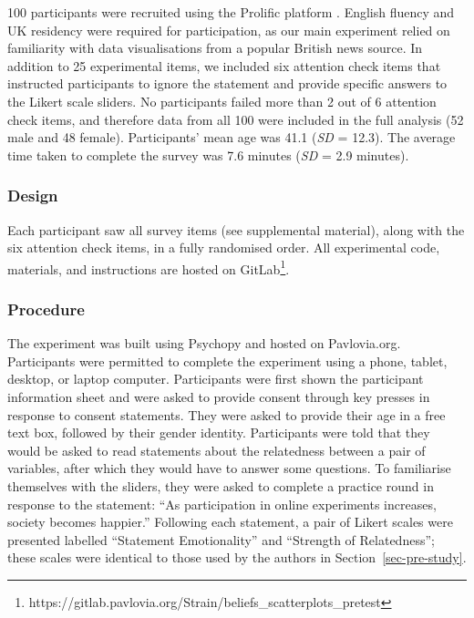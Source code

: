 \documentclass[sigconf]{acmart}
\begin{document}
100 participants were recruited using the Prolific platform
\citep{prolific}. English fluency and UK residency were required for
participation, as our main experiment relied on familiarity with data
visualisations from a popular British news source. In addition to 25
experimental items, we included six attention check items that
instructed participants to ignore the statement and provide specific
answers to the Likert scale sliders. No participants failed more than 2
out of 6 attention check items, and therefore data from all 100 were
included in the full analysis (52 male and 48 female). Participants'
mean age was 41.1 (\emph{SD} = 12.3). The average time taken to complete
the survey was 7.6 minutes (\emph{SD} = 2.9 minutes).

\subsubsection{Design}\label{sec-design-pre}

Each participant saw all survey items (see supplemental material), along
with the six attention check items, in a fully randomised order. All
experimental code, materials, and instructions are hosted on
GitLab\footnote{https://gitlab.pavlovia.org/Strain/beliefs\_scatterplots\_pretest}.

\subsubsection{Procedure}\label{sec-procedure-pre}

The experiment was built using Psychopy \citep{pierce_2019} and hosted
on Pavlovia.org. Participants were permitted to complete the experiment
using a phone, tablet, desktop, or laptop computer. Participants were
first shown the participant information sheet and were asked to provide
consent through key presses in response to consent statements. They were
asked to provide their age in a free text box, followed by their gender
identity. Participants were told that they would be asked to read
statements about the relatedness between a pair of variables, after
which they would have to answer some questions. To familiarise
themselves with the sliders, they were asked to complete a practice
round in response to the statement: ``As participation in online
experiments increases, society becomes happier.'' Following each
statement, a pair of Likert scales were presented labelled ``Statement
Emotionality'' and ``Strength of Relatedness''; these scales were
identical to those used by the authors in Section~\ref{sec-pre-study}.
\end{document}

